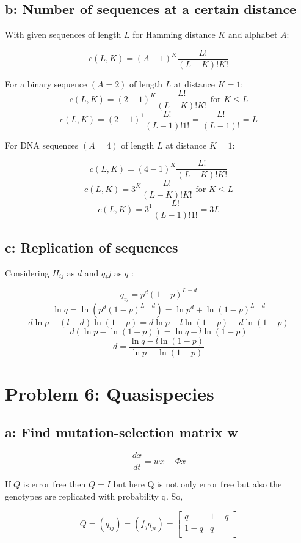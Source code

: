 \subsection{b: Number of sequences at a certain distance}

With given sequences of length $L$ for Hamming distance $K$ and alphabet $A$:

\[  c(L,K) = (A-1)^K\frac{L!}{(L-K)!K!} \]

For a binary sequence $(A = 2)$ of length $L$ at distance $K = 1$: 
\[  c(L,K) = (2-1)^K\frac{L!}{(L-K)!K!} \text{ for } K\leq L  \]
\[  c(L,K) = (2-1)^1\frac{L!}{(L-1)!1!} = \frac{L!}{(L-1)!}  = L\]

For DNA sequences $(A = 4) $ of length $L$ at distance $K = 1 $:

\[  c(L,K) = (4-1)^K\frac{L!}{(L-K)!K!} \]
\[  c(L,K) = 3^K\frac{L!}{(L-K)!K!} \text{ for } K\leq L \]
\[  c(L,K) = 3^1\frac{L!}{(L-1)!1!} = 3L \]

\subsection{c: Replication of sequences}

Considering $H_{ij}$ as $d$ and $q_ij$ as $q$ : 

\[ q_{ij} = p^d(1-p)^{L-d} \]
\[ \ln q = \ln (p^d(1-p)^{L-d}) = \ln p^d + \ln (1-p)^{L-d} \]
\[ d \ln p + (l-d) \ln (1-p) = d \ln p - l \ln(1-p) - d \ln (1-p)  \]
\[ d(\ln p - \ln (1-p))  = \ln q - l \ln (1-p) \]
\[ d = \frac{\ln q - l \ln (1-p)}{\ln p -\ln (1-p)}\]


\setcounter{chapter}{6}
\setcounter{section}{0}
\section{Problem 6: Quasispecies}
\subsection{a: Find mutation-selection matrix w}
\[ \frac{dx}{dt} = wx - \varPhi x \] 

If $Q$ is error free then $Q=I$ but here Q is not only error free but also the genotypes are replicated with probability q. So, 

\[ Q = (q_{ij}) = (f_{j}q_{ji}) = \begin{bmatrix}
       q & 1-q\\[0.3em]
       1-q & q \\[0.3em]
     \end{bmatrix} \]

